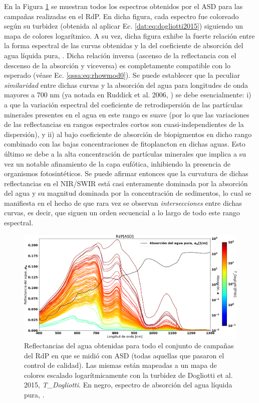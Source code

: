         En la Figura \ref{dat:HyperASD} se muestran todos los espectros obtenidos por el ASD para las campañas realizadas en el RdP. En dicha figura, cada espectro fue coloreado según su turbidez (obtenida al aplicar Ec. \ref{dat:eq:dogliotti2015}) siguiendo un mapa de colores logarítmico. A su vez, dicha figura exhibe la fuerte relación entre la forma espectral de las curvas obtenidas y la del coeficiente de absorción del agua líquida pura, \cite{pope1997}\cite{kou1993}. Dicha relación inversa (ascenso de la reflectancia con el descenso de la absorción y viceversa) es completamente compatible con lo esperado (véase Ec. \ref{qssa:eq:rhowmod0}). Se puede establecer que la peculiar \textit{similaridad} entre dichas curvas y la absorción del agua para longitudes de onda mayores a 700 nm (ya notada en Ruddick et al. 2006, \cite{ruddick2006}) se debe esencialmente: i) a que la variación espectral del coeficiente de retrodispersión de las partículas minerales presentes en el agua en este rango es suave (por lo que las variaciones de las reflectancias en rangos espectrales cortos son cuasi-independientes de la dispersión), y ii) al bajo coeficiente de absorción de biopigmentos en dicho rango combinado con las bajas concentraciones de fitoplancton en dichas aguas. Esto último se debe a la alta concentración de partículas minerales que implica a su vez un notable afinamiento de la capa eufótica, inhibiendo la presencia de organismos fotosintéticos. Se puede afirmar entonces que la curvatura de dichas reflectancias en el NIR/SWIR está casi enteramente dominada por la absorción del agua y su magnitud dominada por la concentración de sedimentos, lo cual se manifiesta en el hecho de que rara vez se observan \textit{intersecciones} entre dichas curvas, es decir, que siguen un orden secuencial a lo largo de todo este rango espectral.
        
        
        \begin{figure}
        \centering
        \includegraphics[width=\textwidth]{dat/figures/HyperASD.png}
        \caption[Reflectancias del agua obtenidas con el ASD sobre el RdP]{Reflectancias del agua obtenidas para todo el conjunto de campañas del RdP en que se midió con ASD (todas aquellas que pasaron el control de calidad). Las mismas están mapeadas a un mapa de colores escalado logarítmicamente con la turbidez de Dogliotti et al. 2015, \textit{T\_Dogliotti}. En negro, espectro de absorción del agua líquida pura, \cite{obpg}.}
        \label{dat:HyperASD}
        \end{figure}
    
